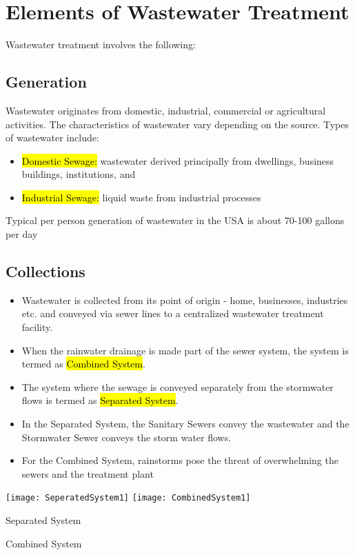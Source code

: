 \chapter{Elements of Wastewater Treatment}

Wastewater treatment involves the following:

\section{Generation}

Wastewater originates from domestic, industrial, commercial or agricultural activities. The characteristics of wastewater vary depending on the source. Types of wastewater include: 
\begin{itemize}
\item \hl{Domestic Sewage:}  wastewater derived principally from dwellings, business buildings, institutions, and \\
\item \hl{Industrial Sewage:}  liquid waste from industrial processes\\
\end{itemize}
Typical per person generation of wastewater in the USA is about 70-100 gallons per day

\section{Collections}

\begin{itemize}
\item Wastewater is collected from its point of origin - home, businesses, industries etc. and conveyed via sewer lines to a centralized wastewater treatment facility.  
\item When the rainwater drainage is made part of the sewer system, the system is termed as \hl{Combined System}.  
\item The system where the sewage is conveyed separately from the stormwater flows is termed as \hl{Separated System}.  
\item In the Separated System, the Sanitary Sewers convey the wastewater and the Stormwater Sewer conveys the storm water flows.  
\item For the Combined System, rainstorms pose the threat of overwhelming the sewers and the treatment plant
\end{itemize}  
\begin{center}
\texttt{[image: SeperatedSystem1]} \hspace{1 cm} \texttt{[image: CombinedSystem1]}
\end{center}
			\hspace{2.6cm} Separated System \hspace{3.2cm} \parbox{\textwidth}{Combined System}\\

